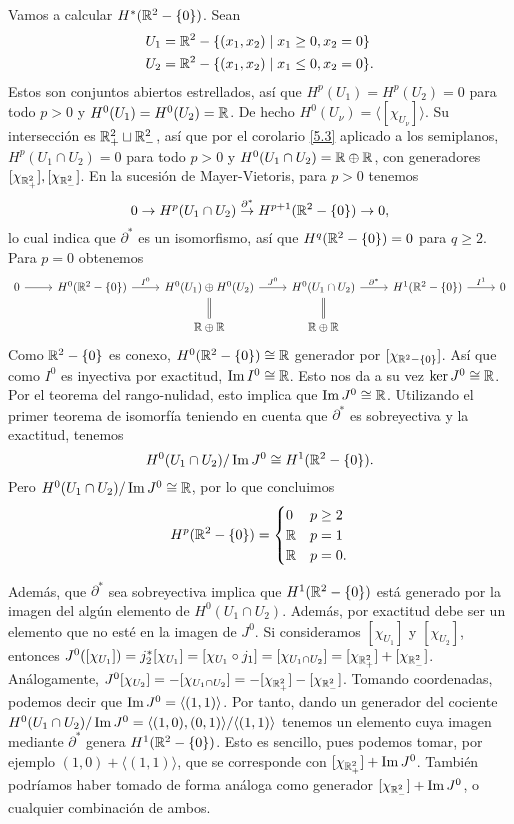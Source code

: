 \documentclass[CV.tex]{subfiles}
\begin{document}
\begin{ej}\label{menospunto}
Vamos a calcular $H^*(\mathbb{R}^2-\{0\})$. Sean
\begin{align*}
&U_1=\mathbb{R}^2-\{(x_1,x_2)\mid x_1\geq 0, x_2=0\}\\
&U_2=\mathbb{R}^2-\{(x_1,x_2)\mid x_1\leq 0, x_2=0\}.
\end{align*}
Estos son conjuntos abiertos estrellados, así que $H^p(U_1)=H^p(U_2)=0$ para todo $p>0$ y $H^0(U_1)=H^0(U_2)=\mathbb{R}$. De hecho $H^0(U_{\nu})=\langle [\chi_{U_{\nu}}]\rangle$. Su intersección es $\mathbb{R}^2_+\sqcup\mathbb{R}^2_-$, así que por el corolario \ref{5.3} aplicado a los semiplanos, $H^p(U_1\cap U_2)=0$ para todo $p>0$ y $H^0(U_1\cap U_2)=\mathbb{R}\oplus\mathbb{R}$, con generadores $[\chi_{\mathbb{R}^2_+}],[\chi_{\mathbb{R}^2_-}]$. En la sucesión de Mayer-Vietoris, para $p>0$ tenemos
\[
0\to H^p(U_1\cap U_2)\overset{\partial^*}{\to} H^{p+1}(\mathbb{R}^2-\{0\})\to 0,
\]
lo cual indica que $\partial^*$ es un isomorfismo, así que $H^{q}(\mathbb{R}^2-\{0\})=0$ para $q\geq 2$. Para $p=0$ obtenemos
\[
\begin{tikzcd}
0\arrow[r] & H^0(\R^2-\{0\})\arrow[r,"I^0"] & H^0(U_1)\oplus H^0(U_2)\arrow[r, "J^0"]\arrow[d,equals] & H^0(U_1\cap U_2)\arrow[r,"\partial^*"]\arrow[d, equals] & H^1(\R^2-\{0\})\arrow[r,"I^1"] & 0\\
 & & \R\oplus\R &\R\oplus\R & & 
\end{tikzcd}
\]
Como $\mathbb{R}^2-\{0\}$ es conexo, $H^0(\mathbb{R}^2-\{0\})\cong\mathbb{R}$ generador por $[\chi_{\mathbb{R}^2-\{0\}}]$. Así que como $I^0$ es inyectiva por exactitud, $\operatorname{Im}{I^0}\cong\mathbb{R}$. Esto nos da a su vez $\ker{J^0}\cong\mathbb{R}$. Por el teorema del rango-nulidad, esto implica que $\operatorname{Im}{J^0}\cong\mathbb{R}$. Utilizando el primer teorema de isomorfía teniendo en cuenta que $\partial^*$ es sobreyectiva y la exactitud, tenemos
\[
H^0(U_1\cap U_2)/\operatorname{Im}{J^0}\cong H^1(\mathbb{R}^2-\{0\}).
\]
Pero $H^0(U_1\cap U_2)/\operatorname{Im}{J^0}\cong\mathbb{R}$, por lo que concluimos
\[
H^p(\mathbb{R}^2-\{0\})=\begin{cases}
0 & p\geq 2\\
\mathbb{R} & p=1\\
\mathbb{R} & p=0.
\end{cases}
\]

Además, que $\partial^*$ sea sobreyectiva implica que $H^1(\mathbb{R}^2-\{0\})$ está generado por la imagen del algún elemento de $H^0(U_1\cap U_2)$. Además, por exactitud debe ser un elemento que no esté en la imagen de $J^0$. Si consideramos $[\chi_{U_1}]$ y $[\chi_{U_2}]$, entonces $J^0([\chi_{U_1}])=j_2^*[\chi_{U_1}]=[\chi_{U_1}\circ j_1]=[\chi_{U_1\cap U_2}]=[\chi_{\mathbb{R}^2_+}]+[\chi_{\mathbb{R}^2_-}]$. Análogamente, $J^0[\chi_{U_2}]=-[\chi_{U_1\cap U_2}]=-[\chi_{\mathbb{R}^2_+}]-[\chi_{\mathbb{R}^2_-}]$. Tomando coordenadas, podemos decir que $\operatorname{Im}{J^0}=\langle (1,1)\rangle$. Por tanto, dando un generador del cociente $H^0(U_1\cap U_2)/\operatorname{Im}{J^0}=\langle (1,0),(0,1)\rangle/\langle (1,1)\rangle$ tenemos un elemento cuya imagen mediante $\partial^*$ genera $H^1(\mathbb{R}^2-\{0\})$. Esto es sencillo, pues podemos tomar, por ejemplo $(1,0)+\langle (1,1)\rangle$, que se corresponde con $[\chi_{\mathbb{R}^2_+}]+\operatorname{Im}{J^0}$. También podríamos haber tomado de forma análoga como generador $[\chi_{\mathbb{R}^2_-}]+\operatorname{Im}{J^0}$, o cualquier combinación de ambos.
\end{ej}
\end{document}
